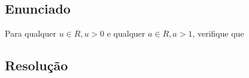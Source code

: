 


\subsection{Enunciado}

Para qualquer $u \in R, u > 0$ e qualquer $a \in R, a > 1$, verifique que

\subsection{Resolução}